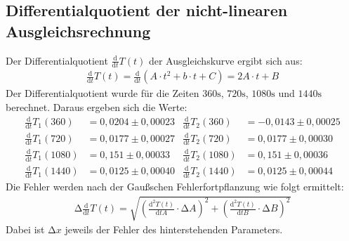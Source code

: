 \subsection{Differentialquotient der nicht-linearen Ausgleichsrechnung}
Der Differentialquotient $\frac{\mathup{d}}{\mathup{d}t} T(t)$ der Ausgleichskurve ergibt sich aus:
\begin{align*}
  \frac{\mathup{d}}{\mathup{d}t} T(t) = \frac{\mathup{d}}{\mathup{d}t}(A\cdot t^2 + b\cdot t + C) = 2 A\cdot t + B
\end{align*}
Der Differentialquotient wurde für die Zeiten $360 \si{\second}$, $720 \si{\second}$, $1080 \si{\second}$ und $1440 \si{\second}$ berechnet.
Daraus ergeben sich die Werte:
\begin{align*}
  \frac{\mathup{d}}{\mathup{d}t} T_1(360) &= 0,0204 \pm 0,00023 &
  \frac{\mathup{d}}{\mathup{d}t} T_2(360) &= -0,0143 \pm 0,00025 \\
  \frac{\mathup{d}}{\mathup{d}t} T_1(720) &= 0,0177 \pm 0,00027 &
  \frac{\mathup{d}}{\mathup{d}t} T_2(720) &= 0,0177 \pm 0,00030 \\
  \frac{\mathup{d}}{\mathup{d}t} T_1(1080) &= 0,151 \pm 0,00033 &
  \frac{\mathup{d}}{\mathup{d}t} T_2(1080) &= 0,151 \pm 0,00036 \\
  \frac{\mathup{d}}{\mathup{d}t} T_1(1440) &= 0,0125 \pm 0,00040 &
  \frac{\mathup{d}}{\mathup{d}t} T_2(1440) &= 0,0125 \pm 0,00044
\end{align*}
Die Fehler werden nach der Gaußschen Fehlerfortpflanzung wie folgt ermittelt:
\begin{align*}
  \increment\frac{\mathup{d}}{\mathup{d}t} T(t) = \sqrt{(\frac{\mathup{d^2}T(t)}{\mathup{d}tA}\cdot\increment A)^2 + (\frac{\mathup{d^2}T(t)}{\mathup{d}tB}\cdot\increment B)^2}
\end{align*}
Dabei ist $\increment x$ jeweils der Fehler des hinterstehenden Parameters.
